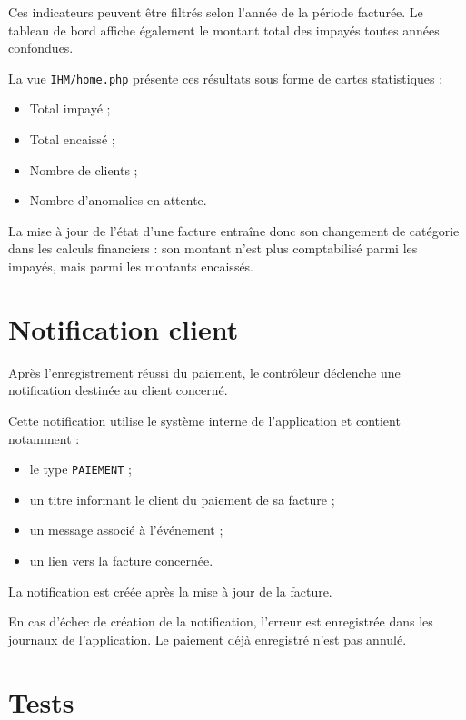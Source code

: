 Ces indicateurs peuvent être filtrés selon l'année de la période facturée. Le tableau de bord affiche également le montant total des impayés toutes années confondues.

La vue \texttt{IHM/home.php} présente ces résultats sous forme de cartes statistiques :
\begin{itemize}
    \item Total impayé ;
    \item Total encaissé ;
    \item Nombre de clients ;
    \item Nombre d'anomalies en attente.
\end{itemize}

La mise à jour de l'état d'une facture entraîne donc son changement de catégorie dans les calculs financiers : son montant n'est plus comptabilisé parmi les impayés, mais parmi les montants encaissés.

\section{Notification client}

Après l'enregistrement réussi du paiement, le contrôleur déclenche une notification destinée au client concerné.

Cette notification utilise le système interne de l'application et contient notamment :
\begin{itemize}
    \item le type \texttt{PAIEMENT} ;
    \item un titre informant le client du paiement de sa facture ;
    \item un message associé à l'événement ;
    \item un lien vers la facture concernée.
\end{itemize}

La notification est créée après la mise à jour de la facture.

En cas d'échec de création de la notification, l'erreur est enregistrée dans les journaux de l'application. Le paiement déjà enregistré n'est pas annulé.

\section{Tests}

